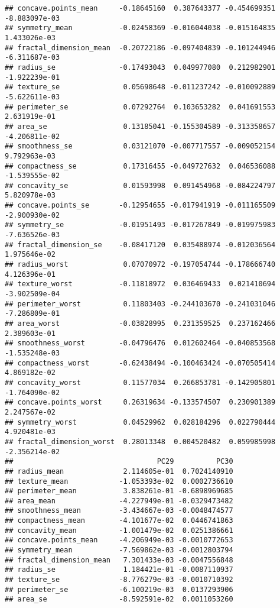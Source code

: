 \documentclass[
]{article}
\begin{document}
\begin{verbatim}
## concave.points_mean     -0.18645160  0.387643377 -0.454699351 -8.883097e-03
## symmetry_mean           -0.02458369 -0.016044038 -0.015164835  1.433026e-03
## fractal_dimension_mean  -0.20722186 -0.097404839 -0.101244946 -6.311687e-03
## radius_se               -0.17493043  0.049977080  0.212982901 -1.922239e-01
## texture_se               0.05698648 -0.011237242 -0.010092889 -5.622611e-03
## perimeter_se             0.07292764  0.103653282  0.041691553  2.631919e-01
## area_se                  0.13185041 -0.155304589 -0.313358657 -4.206811e-02
## smoothness_se            0.03121070 -0.007717557 -0.009052154  9.792963e-03
## compactness_se           0.17316455 -0.049727632  0.046536088 -1.539555e-02
## concavity_se             0.01593998  0.091454968 -0.084224797  5.820978e-03
## concave.points_se       -0.12954655 -0.017941919 -0.011165509 -2.900930e-02
## symmetry_se             -0.01951493 -0.017267849 -0.019975983 -7.636526e-03
## fractal_dimension_se    -0.08417120  0.035488974 -0.012036564  1.975646e-02
## radius_worst             0.07070972 -0.197054744 -0.178666740  4.126396e-01
## texture_worst           -0.11818972  0.036469433  0.021410694 -3.902509e-04
## perimeter_worst          0.11803403 -0.244103670 -0.241031046 -7.286809e-01
## area_worst              -0.03828995  0.231359525  0.237162466  2.389603e-01
## smoothness_worst        -0.04796476  0.012602464 -0.040853568 -1.535248e-03
## compactness_worst       -0.62438494 -0.100463424 -0.070505414  4.869182e-02
## concavity_worst          0.11577034  0.266853781 -0.142905801 -1.764090e-02
## concave.points_worst     0.26319634 -0.133574507  0.230901389  2.247567e-02
## symmetry_worst           0.04529962  0.028184296  0.022790444  4.920481e-03
## fractal_dimension_worst  0.28013348  0.004520482  0.059985998 -2.356214e-02
##                                  PC29          PC30
## radius_mean              2.114605e-01  0.7024140910
## texture_mean            -1.053393e-02  0.0002736610
## perimeter_mean           3.838261e-01 -0.6898969685
## area_mean               -4.227949e-01 -0.0329473482
## smoothness_mean         -3.434667e-03 -0.0048474577
## compactness_mean        -4.101677e-02  0.0446741863
## concavity_mean          -1.001479e-02  0.0251386661
## concave.points_mean     -4.206949e-03 -0.0010772653
## symmetry_mean           -7.569862e-03 -0.0012803794
## fractal_dimension_mean   7.301433e-03 -0.0047556848
## radius_se                1.184421e-01 -0.0087110937
## texture_se              -8.776279e-03 -0.0010710392
## perimeter_se            -6.100219e-03  0.0137293906
## area_se                 -8.592591e-02  0.0011053260

\end{verbatim}
\end{document}
